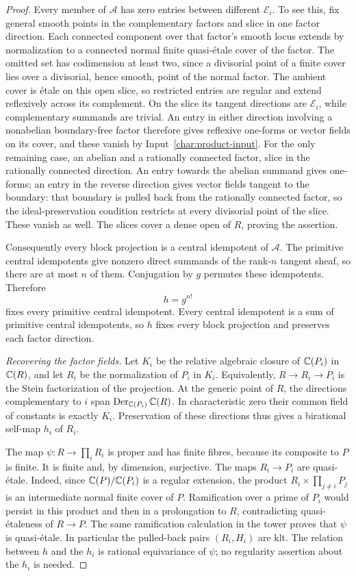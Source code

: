 \begin{proof}
Every member of $\mathcal A$ has zero entries between different
$\mathcal E_i$.  To see this, fix general smooth points in the
complementary factors and slice in one factor direction.  Each
connected component over that factor's smooth locus extends by
normalization to a connected normal finite quasi-\'etale cover of
the factor.  The omitted set has codimension at least two, since a
divisorial point of a finite cover lies over a divisorial, hence
smooth, point of the normal factor.  The ambient cover is \'etale
on this open slice, so restricted entries are regular and extend
reflexively across its complement.  On the slice its tangent
directions are $\mathcal E_i$, while complementary summands are
trivial.  An entry
in either direction involving a nonabelian boundary-free factor
therefore gives reflexive one-forms or vector fields on its cover,
and these vanish by Input~\ref{char:product-input}.  For the only
remaining case, an abelian and a rationally connected factor, slice
in the rationally connected direction.  An entry towards the
abelian summand gives one-forms; an entry in the reverse direction
gives vector fields tangent to the boundary: that boundary is
pulled back from the rationally connected factor, so the
ideal-preservation condition restricts at every divisorial point
of the slice.  These vanish as well.  The slices
cover a dense open of $R$, proving the assertion.

Consequently every block projection is a central idempotent of
$\mathcal A$.  The primitive central idempotents give nonzero
direct summands of the rank-$n$ tangent sheaf, so there are at most
$n$ of them.  Conjugation by $g$ permutes these idempotents.
Therefore
\[
                              h=g^{n!}
\]
fixes every primitive central idempotent.  Every central idempotent
is a sum of primitive central idempotents, so $h$ fixes every block
projection and preserves each factor direction.

\emph{Recovering the factor fields.}
Let $K_i$ be the relative algebraic closure of $\mathbb C(P_i)$ in
$\mathbb C(R)$, and let $R_i$ be the normalization of $P_i$ in $K_i$.
Equivalently, $R\to R_i\to P_i$ is the Stein factorization of the
projection.  At the generic point of $R$, the directions
complementary to $i$ span
$\operatorname{Der}_{\mathbb C(P_i)}\mathbb C(R)$.  In characteristic zero their
common field of constants is exactly $K_i$.  Preservation of these
directions thus gives a birational self-map $h_i$ of $R_i$.

The map $\psi:R\to\prod_iR_i$ is proper and has finite fibres,
because its composite to $P$ is finite.  It is finite and, by
dimension, surjective.  The maps $R_i\to P_i$ are quasi-\'etale.
Indeed, since $\mathbb C(P)/\mathbb C(P_i)$ is a regular extension, the product
$R_i\times\prod_{j\ne i}P_j$ is an intermediate normal finite
cover of $P$.  Ramification over a prime of $P_i$ would persist
in this product and then in a prolongation to $R$, contradicting
quasi-\'etaleness of $R\to P$.  The same ramification calculation
in the tower proves that $\psi$ is quasi-\'etale.  In particular the
pulled-back pairs $(R_i,H_i)$ are klt.  The relation
between $h$ and the $h_i$ is rational equivariance of $\psi$; no
regularity assertion about the $h_i$ is needed.


\end{proof}
